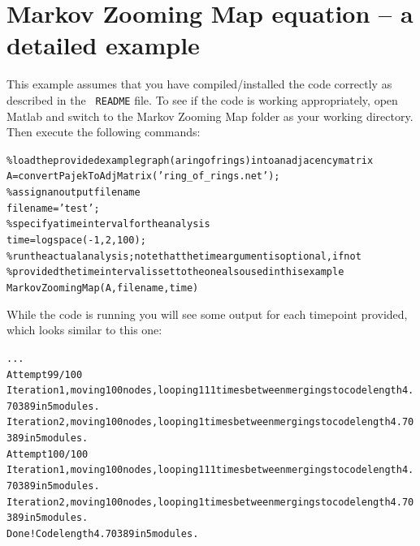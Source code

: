 \documentclass[a4paper,10pt]{scrartcl}
\begin{document}
\section*{Markov Zooming Map equation -- a detailed example}

This example assumes that you have compiled/installed the code correctly as described in the \texttt{ README} file.
To see if the code is working appropriately, open Matlab and switch to the Markov Zooming Map folder as your working directory. Then execute the following commands:
\begin{alltt}
\% load the provided example graph (a ring of rings) into an adjacency matrix
A = convertPajekToAdjMatrix('ring_of_rings.net');\\
\% assign an output filename
filename = 'test';\\
\% specify a time interval for the analysis
time =logspace(-1,2,100);\\
\% run the actual analysis; note that the time argument is optional, if not
\% provided the time interval is set to the one also used in this example
MarkovZoomingMap(A,filename,time)
\end{alltt}

While the code is running you will see some output for each timepoint provided, which looks similar to this one:
\begin{scriptsize}
\begin{alltt}
...
Attempt 99/100
Iteration 1, moving 100 nodes, looping 1 1 1 times between mergings to code length 4.70389 in 5 modules.
Iteration 2, moving 100 nodes, looping 1 times between mergings to code length 4.70389 in 5 modules.
Attempt 100/100
Iteration 1, moving 100 nodes, looping 1 1 1 times between mergings to code length 4.70389 in 5 modules.
Iteration 2, moving 100 nodes, looping 1 times between mergings to code length 4.70389 in 5 modules.
Done! Code length 4.70389 in 5 modules.
\end{alltt}
\end{scriptsize}
\end{document}
